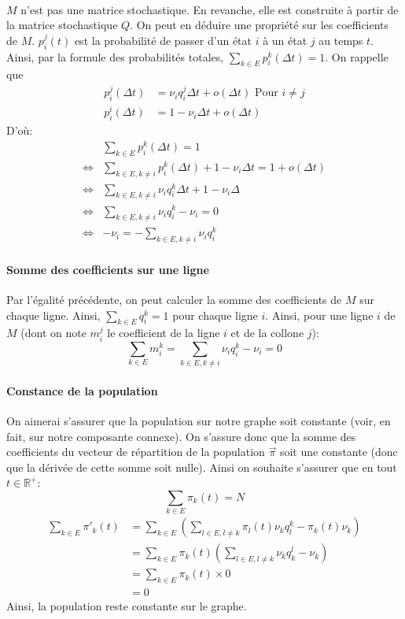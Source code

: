 \documentclass[a4paper]{article}
\theoremstyle{plain}
\theoremstyle{definition}
\theoremstyle{remark}
\begin{document}
\paragraph{}$M$ n'est pas une matrice stochastique. En revanche, elle est construite à partir de la matrice stochastique $Q$. On peut en déduire une propriété sur les coefficients de $M$.
$p_i^j(t)$ est la probabilité de passer d'un état $i$ à un état $j$ au temps $t$. Ainsi, par la formule des probabilités totales, $\sum_{k\in E}p_i^k(\Delta t)=1$.
On rappelle que
\begin{align*}
    p_i^j(\Delta t)&=\nu_iq_i^j\Delta t+o(\Delta t) \text{      Pour }i\neq j\\
    p_i^i(\Delta t)&=1-\nu_i\Delta t+o(\Delta t)
\end{align*}
D'où:
\begin{align*}
   &\sum_{k\in E}p_i^k(\Delta t)=1\\
   \Longleftrightarrow &\sum_{k\in E,k\neq i}p_i^k(\Delta t)+1-\nu_i\Delta t=1+o(\Delta t)\\
   \Longleftrightarrow &\sum_{k\in E,k\neq i}\nu_iq_i^k\Delta t+1-\nu_i\Delta\\
   \Longleftrightarrow &\sum_{k\in E,k\neq i}\nu_iq_i^k-\nu_i=0\\
   \Longleftrightarrow &-\nu_i=-\sum_{k\in E,k\neq i}\nu_iq_i^k
\end{align*}

\paragraph{Somme des coefficients sur une ligne}
Par l'égalité précédente, on peut calculer la somme des coefficients de $M$ sur chaque ligne. Ainsi, $\sum_{k\in E}q_i^k=1$ pour chaque ligne $i$. Ainsi, pour une ligne $i$ de $M$ (dont on note $m_i^j$ le coefficient de la ligne $i$ et de la collone $j$):
$$
    \sum_{k\in E}m_i^k=\sum_{k\in E, k\neq i}\nu_iq_i^k-\nu_i=0$$
\paragraph{Constance de la population}
On aimerai s'assurer que la population sur notre graphe soit constante (voir, en fait, sur notre composante connexe). On s'assure donc que la somme des coefficients du vecteur de répartition de la population $\vec{\pi}$ soit une constante (donc que la dérivée de cette somme soit nulle). Ainsi on souhaite s'assurer que en tout $t\in \mathbb{R}^+$:
$$\sum_{k\in E}\pi_k(t)=N$$
\begin{align*}
\sum_{k\in E}\pi'_k(t)&=\sum_{k\in E}(\sum_{l\in E, l\neq k}\pi_l(t)\nu_kq_l^k-\pi_k(t)\nu_k)\\
&=\sum_{k\in E}\pi_k(t)(\sum_{l\in E, l\neq k}\nu_kq_k^l-\nu_k)\\
&=\sum_{k\in E}\pi_k(t)\times 0\\
&=0
\end{align*}
Ainsi, la population reste constante sur le graphe.\\
\end{document}
